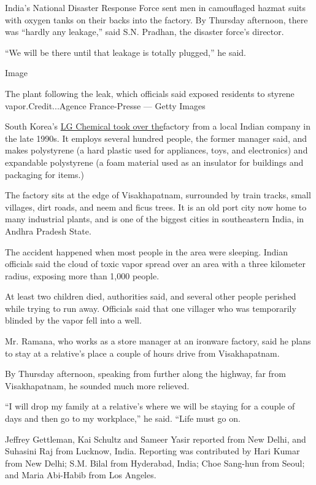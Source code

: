India's National Disaster Response Force sent men in camouflaged hazmat
suits with oxygen tanks on their backs into the factory. By Thursday
afternoon, there was ``hardly any leakage,'' said S.N. Pradhan, the
disaster force's director.

``We will be there until that leakage is totally plugged,'' he said.

Image

The plant following the leak, which officials said exposed residents to
styrene vapor.Credit...Agence France-Presse --- Getty Images

South Korea's \href{http://www.lgpi.co.in/AboutLGPI.html}{LG Chemical
took over the}factory from a local Indian company in the late 1990s. It
employs several hundred people, the former manager said, and makes
polystyrene (a hard plastic used for appliances, toys, and electronics)
and expandable polystyrene (a foam material used as an insulator for
buildings and packaging for items.)

The factory sits at the edge of Visakhapatnam, surrounded by train
tracks, small villages, dirt roads, and neem and ficus trees. It is an
old port city now home to many industrial plants, and is one of the
biggest cities in southeastern India, in Andhra Pradesh State.

The accident happened when most people in the area were sleeping. Indian
officials said the cloud of toxic vapor spread over an area with a three
kilometer radius, exposing more than 1,000 people.

At least two children died, authorities said, and several other people
perished while trying to run away. Officials said that one villager who
was temporarily blinded by the vapor fell into a well.

Mr. Ramana, who works as a store manager at an ironware factory, said he
plans to stay at a relative's place a couple of hours drive from
Visakhapatnam.

By Thursday afternoon, speaking from further along the highway, far from
Visakhapatnam, he sounded much more relieved.

``I will drop my family at a relative's where we will be staying for a
couple of days and then go to my workplace,'' he said. ``Life must go
on.

Jeffrey Gettleman, Kai Schultz and Sameer Yasir reported from New Delhi,
and Suhasini Raj from Lucknow, India. Reporting was contributed by Hari
Kumar from New Delhi; S.M. Bilal from Hyderabad, India; Choe Sang-hun
from Seoul; and Maria Abi-Habib from Los Angeles.

